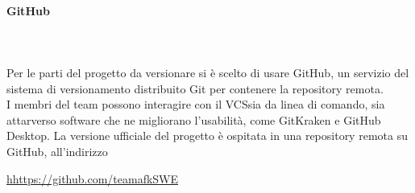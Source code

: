 \paragraph{GitHub} \mbox{} \\ \mbox{} \\
Per le parti del progetto da versionare si è scelto di usare GitHub\glo, un servizio del sistema di versionamento distribuito Git per contenere la repository remota. \\
I membri del team possono interagire con il VCS\glo sia da linea di comando, sia attarverso software che ne migliorano l'usabilità, come GitKraken e GitHub Desktop. La versione ufficiale del progetto è ospitata in una repository remota su GitHub, all'indirizzo \\
\centerline{\url{hhttps://github.com/teamafkSWE}}

